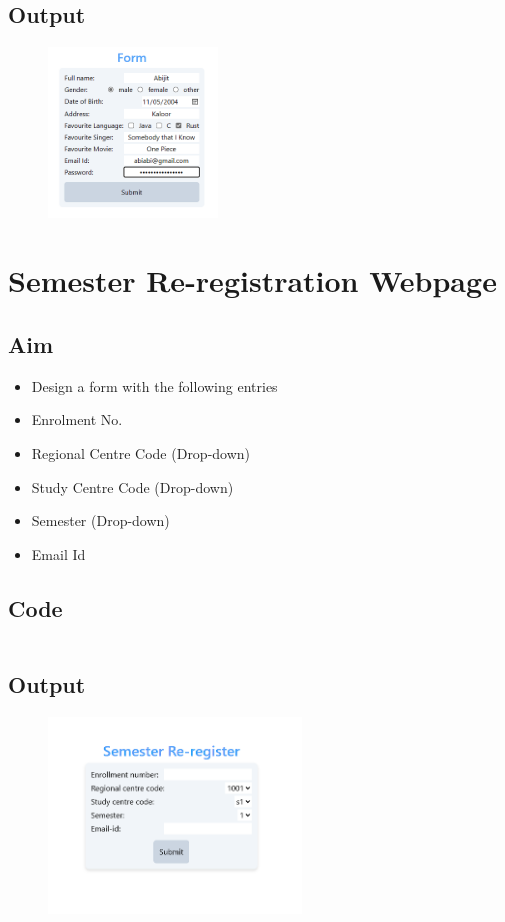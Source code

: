 \documentclass{article}
\begin{document}
\subsection{Output}
\begin{figure}[h!]
	\centering
	\includegraphics[width=0.4\textwidth]{./Assets/p04.png}
\end{figure}
\newpage

\section{Semester Re-registration Webpage}
\subsection{Aim}
\begin{itemize}
	\item Design a form with the following entries
	\item Enrolment No.
	\item Regional Centre Code (Drop-down)
	\item Study Centre Code (Drop-down)
	\item Semester (Drop-down)
	\item Email Id
\end{itemize}

\subsection{Code}
\inputminted[frame=lines, linenos, breaklines, breakanywhere, numberblanklines=false]{html}{./prog_5/index.html}

\subsection{Output}
\begin{figure}[h!]
	\centering
	\includegraphics[width=0.6\textwidth]{./Assets/p05.png}
\end{figure}
\newpage
\end{document}
